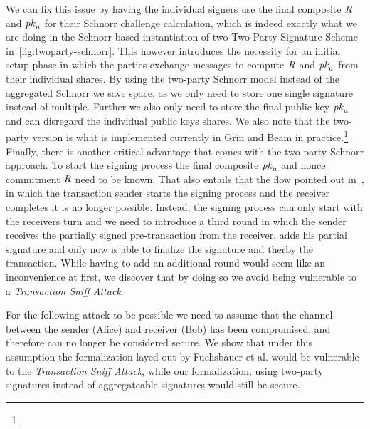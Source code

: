 We can fix this issue by having the individual signers use the final composite $\mathit{R}$ and $\mathit{pk}_a$ for their Schnorr challenge calculation, which is indeed exactly what we are doing in the Schnorr-based instantiation of two Two-Party Signature Scheme in~\cref{fig:twoparty-schnorr}.
This however introduces the necessity for an initial setup phase in which the parties exchange messages to compute $\mathit{R}$ and $\mathit{pk}_a$ from their individual shares.
By using the two-party Schnorr model instead of the aggregated Schnorr we save space, as we only need to store one single signature instead of multiple.
Further we also only need to store the final public key $\mathit{pk}_a$ and can disregard the individual public keys shares.
We also note that the two-party version is what is implemented currently in Grin and Beam in practice.\footnote{\urlgrinexplained}
Finally, there is another critical advantage that comes with the two-party Schnorr approach.
To start the signing process the final composite $\mathit{pk}_a$ and nonce commitment $\mathit{R}$ need to be known.
That also entails that the flow pointed out in~\cite{fuchsbauer2019aggregate}, in which the transaction sender starts the signing process and the receiver completes it is no longer possible.
Instead, the signing process can only start with the receivers turn and we need to introduce a third round in which the sender receives the partially signed pre-transaction from the receiver, adds his partial signature and only now is able to finalize the signature and therby the transaction.
While having to add an additional round would seem like an inconvenience at first, we discover that by doing so we avoid being vulnerable to a \emph{Transaction Sniff Attack}.

For the following attack to be possible we need to assume that the channel between the sender (Alice) and receiver (Bob) has been compromised, and therefore can no longer be considered secure.
We show that under this assumption the formalization layed out by Fuchsbauer et al. would be vulnerable to the \emph{Transaction Sniff Attack}, while our formalization, using two-party signatures instead of aggregateable signatures would still be secure.
